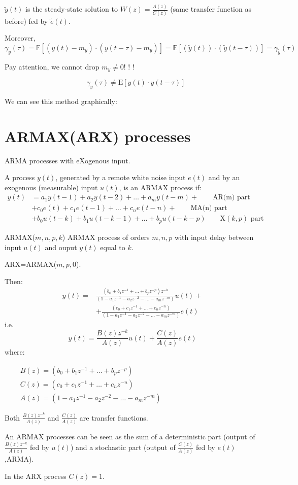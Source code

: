 $\tilde{y}(t)$ is the steady-state solution to $W(z)=\frac{A(z)}{C(z)}$ (same transfer function as before) fed by $\tilde{e}(t)$.

Moreover,
$$
\gamma_{y}(\tau)=\mathbb{E}\left[\left(y(t)-m_{y}\right) \cdot\left(y(t-\tau)-m_{y}\right)\right]=\mathbb{E}[(\tilde{y}(t)) \cdot(\tilde{y}(t-\tau))]=\gamma_{\tilde{y}}(\tau)
$$

Pay attention, we cannot drop $m_{y} \neq 0 $! ! ! 

$$\quad \gamma_{y}(\tau) \neq \mathrm{E}[y(t) \cdot y(t-\tau)]$$

We can see this method graphically:


\section{ARMAX(ARX) processes}
ARMA processes with eXogenous input.

A process $y(t)$, generated by a remote white noise input $e(t)$ and by an exogenous (measurable) input $u(t)$, is an ARMAX process if:
\begin{align*}
	y(t)&=a_{1} y(t-1)+a_{2} y(t-2)+\ldots+a_{m} y(t-m)+\quad\quad \text{AR(m) part}\\
	&+c_{0} e(t)+c_{1} e(t-1)+\ldots+c_{n} e(t-n)+\quad\quad \text{MA(n) part} \\
	&+b_{0} u(t-k)+b_{1} u(t-k-1)+\ldots+b_{p} u(t-k-p) \quad\quad \mathrm{X}(k, p) \text{ part}
\end{align*}

ARMAX($m,n,p,k$) ARMAX process of orders $m,n,p$ with input delay between input $u(t)$ and ouput $y(t)$ equal to $k$.

ARX=ARMAX($m,p,0$).

Then:
\begin{align*}
	y(t)=& \frac{\left(b_{0}+b_{1} z^{-1}+\ldots+b_{p} z^{-p}\right) z^{-k}}{\left(1-a_{1} z^{-1}-a_{2} z^{-2}-\ldots-a_{m} z^{-m}\right)} u(t)+\\
	&+\frac{\left(c_{0}+c_{1} z^{-1}+\ldots+c_{n} z^{-n}\right)}{\left(1-a_{1} z^{-1}-a_{2} z^{-2}-\ldots-a_{m} z^{-m}\right)} e(t)
\end{align*}
i.e.
$$
y(t)=\frac{B(z) z^{-k}}{A(z)} u(t)+\frac{C(z)}{A(z)} e(t)
$$
where:

 $\begin{array}{ll}\quad & B(z)=\left(b_{0}+b_{1} z^{-1}+\ldots+b_{p} z^{-p}\right) \\ & C(z)=\left(c_{0}+c_{1} z^{-1}+\ldots+c_{n} z^{-n}\right) \\ &A(z) =\left(1-a_{1} z^{-1}-a_{2} z^{-2}-\ldots-a_{m} z^{-m}\right)\end{array}$

Both $\frac{B(z) z^{-k}}{A(z)}$ and $\frac{C(z)}{A(z)}$ are transfer functions.

An ARMAX processes can be seen as the sum of a deterministic part (output of $\frac{B(z) z^{-k}}{A(z)}$ fed by $u(t)$) and a stochastic part (output of $\frac{C(z)}{A(z)}$ fed by $e(t)$,ARMA).

In the ARX process $C(z)=1$.